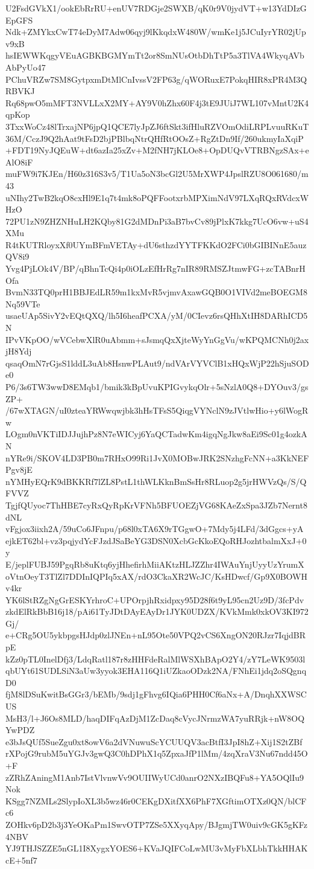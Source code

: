 U2FsdGVkX1/ookEbRrRU+enUV7RDGje2SWXB/qK0r9V0jydVT+w13YdDIzGEpGFS
Ndk+ZMYkxCwT74eDyM7Adw06qyj9lKkqdxW480W/wmKe1j5JCuIyrYR02jUpv9xB
hsIEWWKqgyVEuAGBKBGMYmTt2or8SmNUsOtbDhTtP5a3TlVA4WkyqAVbAbPyUo47
PChuVRZw7SM8GytpxmDtMlCnIvssV2FP63g/qWORuxE7PokqHIR8xPR4M3QRBVKJ
Rq68pwO5mMFT3NVLLxX2MY+AY9V0hZhx60F4j3tE9JUiJ7WL107vMntU2K4qpKop
3TxxWoCz48lTrxajNP6jpQ1QCE7lyJpZJ6ftSkt3ifHluRZVOmOdiLRPLvuuRKuT
36M/CczJ9Q2hAat9tFsD2bjPBlbqNtrQHfRtOOsZ+RgZtDn9If/260ukmyIaXqiP
+FDT19NyJQEuW+dt6azIa25xZv+M2fNH7jKLOe8+OpDUQvVTRBNgzSAx+eAlO8iF
muFW9i7KJEn/H60z316S3v5/T1Ua5oN3bcGl2U5MrXWP4JpslRZU8O061680/m43
uNIhy2TwB2kqO8cxHl9E1q7t4mk8oPQFFootxrbMPXimNdV97LXqRQxRVdcxWHzO
72PU1zN9ZHZNHuLH2KQby81G2dMDnPi3aB7bvCv89jPlxK7kkg7UcO6vw+uS4XMu
R4tKUTRloyxXf0UYmBFmVETAy+dU6sthzdYYTFKKdO2FCi0bGIBINnE5auzQV8i9
Yvg4PjLOk4V/BP/qBhnTcQi4p0iOLzEfHrRg7nIR89RMSZJtmwFG+zcTABnrHOfa
BvmN33TQ0prH1BBJEdLR59m1kxMvR5vjmvAxawGQB0O1VIVd2meBOEGM8Nq59VTe
usaeUAp5SivY2vEQtQXQ/lh5I6heafPCXA/yM/0CIevz6rsQHhXtIH8DARhICD5N
IPvVKpOO/wVCebwXlR0uAbmm+sJsmqQxXjteWyYnGgVu/wKPQMCNh0j2axjH8Ydj
qsaqOmN7rGjsS1lddL3uAb8HsnwPLAut9/ndVArVYVClB1xHQxWjP22hSjuSODe0
P6/3s6TW3wwD8EMqb1/bmik3kBpUvuKPIGvykqOlr+5sNzlA0Q8+DYOuv3/gsZP+
/67wXTAGN/uI0zteaYRWwqwjbk3hHsTFsS5QiqgVYNclN9zJVtlwHio+y6lWogRw
LOgm0nVKTiIDJJujhPz8N7eWICyj6YaQCTadwKm4igqNgJkw8aEi9Sc01g4ozkAN
nYRe9i/SKOV4LD3PB0m7RHxO99Ri1JvX0MOBwJRK2SNzhgFcNN+a3KkNEFPgv8jE
nYMHyEQrK9dBKKRf7lZL8PstL1thWLKknBmSsHr8RLuop2g5jrHWVzQs/S/QFVVZ
TgjfQUyoc7ThHBE7cyRxQyRpKrVFNh5BFUOEZjVG68KAeZxSpa3JZb7Nernt8dNL
vFgjox3iixh2A/59uCo6JFnpu/p68l0xTA6X9rTGgwO+7Mdy5j4LFd/3dGgcs+yA
ejkET62bl+vz3pqjydYcFJzdJSaBeYG3DSN0XcbGcKkoEQoRHJozhtbalmXxJ+0y
E/jeplFUBJ59PgqRb8uKtq6yjHhefirhMiiAKtzHLJZZhr4IWAuYnjUyyUzYrumX
oVtnOeyT3TlZl7DDInIQPIq5xAX/rdO3CkaXR2WcJC/KsHDwcf/Gp9X0BOWHv4kr
YK6lStRZgNgGrESKYrhroC+UPOrpjhRxidpxy95D28f6t9yL95cn2Uz9D/3fcPdv
zkdElRkBbB16j18/pAi61TyJDtDAyEAyDr1JYK0UDZX/KVkMmk0xkOV3KI972Gj/
e+CRg5OU5ykbpgsHJdp0zlJNEn+nL95Ote50VPQ2vCS6XngON20RJzr7IqjdBRpE
kZz0pTL0InelDfj3/LdqRatl187r8zHHFdeRalMlWSXhBApO2Y4/zY7LeWK9503l
qbUYt61SUDLSiN3aUw3yyok3EHA116Q1iUZkaoODzk2NA/FNhEi1jdq2oSQgnqD0
fjM8lDSuKwitBsGGr3/bEMb/9sdj1gFhvg6IQia6PHH0Cf6aNx+A/DnqhXXWSCUS
MsH3/l+J6Os8MLD/haqDIFqAzDjM1ZcDaq8cVycJNrmzWA7yuRRjk+nW8OQYwPDZ
e3bJsQUf5SueZgu0xt8owV6a2dVNuwuScYCUUQV3acBtfI3JpI8hZ+Xij1S2tZBf
rXPojG9rubM5uYGJv3gwQ3C0hDPhX1q5ZpxaJfP1lMm/4zqXraV3Nu67ndd45O+F
zZRhZAningM1Anb7IstVlvnwVv9OUIIWyUCd0anrO2NXzIBQFu8+YA5OQlIu9Nok
KSgg7NZMLs2SlypIoXL3b5wz46r0CEKgDXitfXX6PhF7XGftimOTXz0QN/blCFc6
ZOHkv6pD2b3j3YeOKaPm1SwvOTP7ZSe5XXyqApy/BJgmjTW0uiv9cGK5gKFz4NBV
YJ9THJSZZE5nGL1I8XygxYOES6+KVaJQIFCoLwMU3vMyFbXLbhTkkHHAKcE+5nf7
